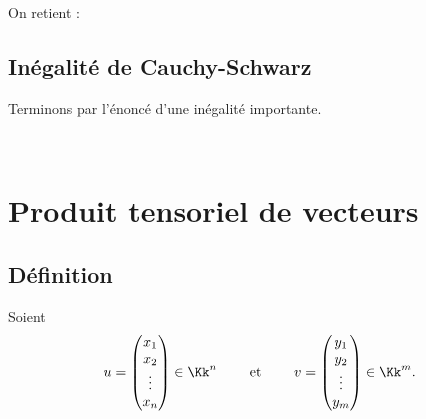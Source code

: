 \documentclass[11pt,class=report,crop=false]{standalone}
\begin{document}
On retient :



\subsection{Inégalité de Cauchy-Schwarz}

Terminons par l'énoncé d'une inégalité importante. 
\begin{theoreme}
~
\end{theoreme}



\section{Produit tensoriel de vecteurs}

\subsection{Définition}

Soient 
$$
u = \begin{pmatrix}x_1\\x_2\\\vdots\\x_n\end{pmatrix} \in \Kk^n
\qquad\text{ et }\qquad
v = \begin{pmatrix}y_1\\y_2\\\vdots\\y_m\end{pmatrix} \in \Kk^m.
$$
\end{document}
